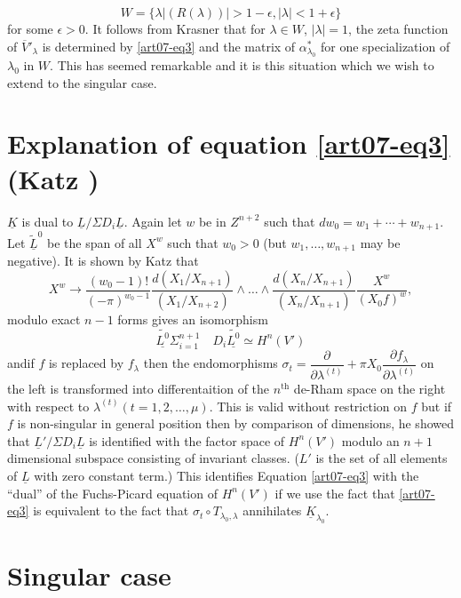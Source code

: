 \begin{equation}
W=\{\lambda|(R(\lambda))|>1-\epsilon, |\lambda|<1+\epsilon\}\label{art07-eq4}
\end{equation}
for some $\epsilon>0$. It follows from Krasner that for $\lambda\in W$, $|\lambda|=1$, the zeta function of $\overline{V}'_{\lambda}$ is determined by \eqref{art07-eq3} and the matrix of $\alpha^{*}_{\lambda_{0}}$ for one specialization of $\lambda_{0}$ in $W$. This has seemed remarkable and it is this situation which we wish to extend to the singular case.

\section{Explanation of equation \eqref{art07-eq3} (Katz \cite{art07-key5})}\label{art07-sec3}

$\underline{K}$ is dual to $\underline{L}/\Sigma D_{i}\underline{L}$. Again let $w$ be in $Z^{n+2}$ such that $dw_{0}=w_{1}+\cdots+w_{n+1}$. Let $\widetilde{\underline{L}}^{0}$ be the span of all $X^{w}$ such that $w_{0}>0$ (but $w_{1},\ldots,w_{n+1}$ may be negative). It is shown by Katz that
$$
X^{w}\to \dfrac{(w_{0}-1)!}{(-\pi)^{w_{0}-1}}\dfrac{d(X_{1}/X_{n+1})}{(X_{1}/X_{n+2})}\wedge\ldots\wedge\dfrac{d(X_{n}/X_{n+1})}{(X_{n}/X_{n+1})}\dfrac{X^{w}}{(X_{0}f)^{w}},
$$
modulo exact $n-1$ forms gives an isomorphism
$$
\widetilde{\underline{L^{0}}}\Sigma^{n+1}_{i=1}\quad D_{i}\widetilde{\underline{L^{0}}}\simeq H^{n}(V')
$$
and\pageoriginale if $f$ is replaced by $f_{\lambda}$ then the endomorphisms $\sigma_{t}=\dfrac{\partial}{\partial \lambda^{(t)}}+\pi X_{0}\dfrac{\partial f_{\lambda}}{\partial \lambda^{(t)}}$ on the left is transformed into differentaition of the $n^{\text{th}}$ de-Rham space on the right with respect to $\lambda^{(t)}(t=1,2,\ldots,\mu)$. This is valid without restriction on $f$ but if $f$ is non-singular in general position then by comparison of dimensions, he showed that $\underline{L}'/\Sigma D_{i}\underline{L}$ is identified with the factor space of $H^{n}(V')$ modulo an $n+1$ dimensional subspace consisting of invariant classes. ($L'$ is the set of all elements of $\underline{L}$ with zero constant term.) This identifies Equation \eqref{art07-eq3} with the ``dual'' of the Fuchs-Picard equation of $H^{n}(V')$ if we use the fact that \eqref{art07-eq3} is equivalent to the fact that $\sigma_{t}\circ T_{\lambda_{0},\lambda}$ annihilates $\underline{K}_{\lambda_{0}}$.

\section{Singular case \cite{art07-key3}}\label{art07-sec3}

